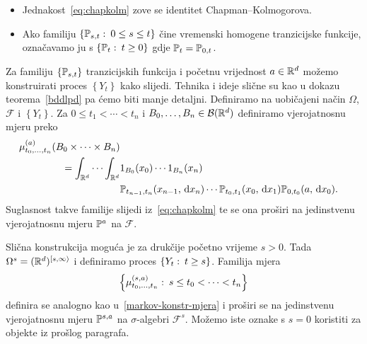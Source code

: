 \documentclass[main.tex]{subfiles}
\begin{document}
\begin{komentar}
	\begin{itemize}
		\item Jednakost~\eqref{eq:chapkolm} zove se identitet Chapman--Kolmogorova.
		\item Ako familiju \( \{\Ptrans_{s, t} \st 0 \le s \le t \} \) čine vremenski homogene tranzicijske funkcije, označavamo ju s \( \left\{ \Ptrans_t \st t \ge 0 \right\} \) gdje \( \Ptrans_t = \Ptrans_{0, t} \).
	\end{itemize}
\end{komentar}
\begin{komentar} \label{markov-konstr}
	Za familiju \( \left\{ \Ptrans_{s, t} \right\} \) tranzicijskih funkcija i početnu vrijednost \( a \in \R^d \) možemo konstruirati proces \( \left\{ Y_t \right\} \) kako slijedi. Tehnika i ideje slične su
	kao u dokazu teorema~\ref{bddlpd} pa ćemo biti manje detaljni. Definiramo na uobičajeni način \( \Omega \), \( \mathcal F \) i \( \left\{ Y_t \right\} \). Za \( 0 \le t_1 < \cdots < t_n \) i \( B_0, \ldots, B_n \in \mathcal B(\R^d) \) definiramo vjerojatnosnu mjeru preko
	\begin{equation} \label{markov-konstr-mjera}
		\begin{aligned}
			\mu_{t_0, \ldots, t_n}^{(a)}(B_0  \times \cdots \times B_n)                       \\
			= \int_{\R^d} \cdots \int_{\R^d} & 1_{B_0}(x_0)\cdots 1_{B_n}(x_n)                \\
			                                 & \Ptrans_{t_{n-1}, t_n}(x_{n-1}, \D x_n) \cdots
			\Ptrans_{t_0, t_1}(x_0, \D x_1) \Ptrans_{0, t_0}(a, \D x_0).
		\end{aligned}
	\end{equation}
	Suglasnost takve familije slijedi iz~\eqref{eq:chapkolm} te se ona proširi na jedinstvenu vjerojatnosnu mjeru \( \Ptrans^{a} \) na \( \mathcal F \).

	Slična konstrukcija moguća je za drukčije početno vrijeme \( s > 0 \). Tada \( \Omega^s = (\R^d)^{\left[ s, \infty \right\rangle} \) i definiramo proces \( \left\{ Y_t \st t \ge s \right\} \).
	Familija mjera \[ \left\{ \mu^{(s,a)}_{t_0,\ldots,t_n} \st s \le t_0 < \cdots < t_n \right\} \]
	definira se analogno kao u~\eqref{markov-konstr-mjera} i proširi se na jedinstvenu vjerojatnosnu mjeru \( \P^{s,a} \) na \( \sigma \)-algebri \( \mathcal F^s \).
	Možemo iste oznake s \( s=0 \) koristiti za objekte iz prošlog paragrafa.
\end{komentar}
\end{document}
